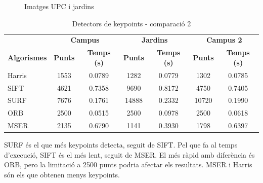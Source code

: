\begin{figure}[!htb]
				\label{fig:awesome_image3}
			\endminipage
			\caption{Imatges UPC i jardins}
		\end{figure}

		\begin{table}[H]
			\begin{center}
				\begin{tabular}{l | c c | c c | c c}
					& \multicolumn{2}{c|}{\textbf{Campus}} & \multicolumn{2}{c|}{\textbf{Jardins}} & \multicolumn{2}{c}{\textbf{Campus 2}} \\
					\textbf{Algorismes} & \textbf{Punts} & \textbf{Temps (s)} & \textbf{Punts} & \textbf{Temps (s)} & \textbf{Punts} & \textbf{Temps (s)} \\ \hline
					Harris & 1553 & 0.0789 & 1282 & 0.0779 & 1302 & 0.0785 \\
					SIFT & 4621 & 0.7358 & 9690 & 0.8172 & 4750 & 0.7405 \\
					SURF & 7676 & 0.1761 & 14888 & 0.2332 & 10720 & 0.1990 \\
					ORB & 2500 & 0.0515 & 2500 & 0.0978 & 2500 & 0.0618 \\
					MSER & 2135 & 0.6790 & 1141 & 0.3930 & 1798 & 0.6397 \\
				\end{tabular}
			\end{center}
			\caption{Detectors de keypoints - comparació 2}
		\end{table}
		\noindent
		SURF és el que més keypoints detecta, seguit de SIFT. Pel que fa al temps d'execució, SIFT és el més lent, seguit de MSER. El més ràpid amb diferència és ORB, pero la
		limitació a 2500 punts podria afectar els resultats. MSER i Harris són els que obtenen menys keypoints.

